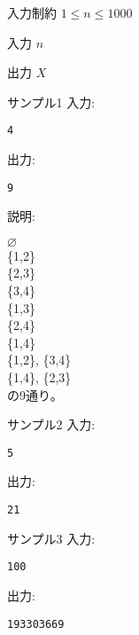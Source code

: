 \documentclass[a4paper,twoside,onecolumn,openany,article,10pt]{memoir}
\theoremstyle{remark}
\begin{document}
\begin{itembox}[l]{入力制約}
$1\le n\le 1000$
\end{itembox}

\begin{itembox}[l]{入力}
$n$
\end{itembox}

\begin{itembox}[l]{出力}
$X$
\end{itembox}

\begin{itembox}[l]{サンプル1}
入力:
\begin{verbatim}
4
\end{verbatim}
出力:
\begin{verbatim}
9
\end{verbatim}
説明:

\vspace{.5em}
$\varnothing$\\
\{1,2\}\\
\{2,3\}\\
\{3,4\}\\
\{1,3\}\\
\{2,4\}\\
\{1,4\}\\
\{1,2\}, \{3,4\}\\
\{1,4\}, \{2,3\}\\
の9通り。
\end{itembox}

\noindent
\begin{minipage}[t]{0.33\hsize}
\begin{itembox}[l]{サンプル2}
入力:
\begin{verbatim}
5
\end{verbatim}
出力:
\begin{verbatim}
21
\end{verbatim}
\end{itembox}
\end{minipage}
\begin{minipage}[t]{0.33\hsize}
\begin{itembox}[l]{サンプル3}
入力:
\begin{verbatim}
100
\end{verbatim}
出力:
\begin{verbatim}
193303669
\end{verbatim}
\end{itembox}
\end{minipage}
\end{document}
